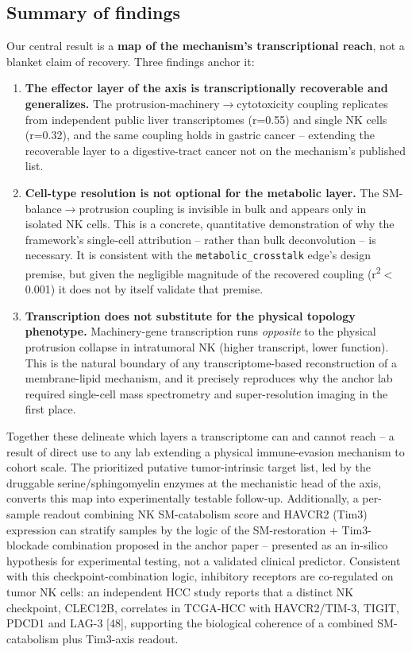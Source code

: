 \documentclass[modern,large,numbered,nocrop]{oup-authoring-template}
\begin{document}
\subsection{Summary of findings}

Our central result is a \textbf{map of the mechanism's transcriptional reach}, not a blanket claim of recovery. Three findings anchor it:

\begin{enumerate}
\item \textbf{The effector layer of the axis is transcriptionally recoverable and generalizes.} The protrusion-machinery$\to$cytotoxicity coupling replicates from independent public liver transcriptomes (r=0.55) and single NK cells (r=0.32), and the same coupling holds in gastric cancer -- extending the recoverable layer to a digestive-tract cancer not on the mechanism's published list.
\item \textbf{Cell-type resolution is not optional for the metabolic layer.} The SM-balance$\to$protrusion coupling is invisible in bulk and appears only in isolated NK cells. This is a concrete, quantitative demonstration of why the framework's single-cell attribution -- rather than bulk deconvolution -- is necessary. It is consistent with the \texttt{metabolic\_crosstalk} edge's design premise, but given the negligible magnitude of the recovered coupling (r\textsuperscript{2}$<$0.001) it does not by itself validate that premise.
\item \textbf{Transcription does not substitute for the physical topology phenotype.} Machinery-gene transcription runs \textit{opposite} to the physical protrusion collapse in intratumoral NK (higher transcript, lower function). This is the natural boundary of any transcriptome-based reconstruction of a membrane-lipid mechanism, and it precisely reproduces why the anchor lab required single-cell mass spectrometry and super-resolution imaging in the first place.
\end{enumerate}

Together these delineate which layers a transcriptome can and cannot reach -- a result of direct use to any lab extending a physical immune-evasion mechanism to cohort scale. The prioritized putative tumor-intrinsic target list, led by the druggable serine/sphingomyelin enzymes at the mechanistic head of the axis, converts this map into experimentally testable follow-up. Additionally, a per-sample readout combining NK SM-catabolism score and HAVCR2 (Tim3) expression can stratify samples by the logic of the SM-restoration + Tim3-blockade combination proposed in the anchor paper -- presented as an in-silico hypothesis for experimental testing, not a validated clinical predictor. Consistent with this checkpoint-combination logic, inhibitory receptors are co-regulated on tumor NK cells: an independent HCC study reports that a distinct NK checkpoint, CLEC12B, correlates in TCGA-HCC with HAVCR2/TIM-3, TIGIT, PDCD1 and LAG-3 [48], supporting the biological coherence of a combined SM-catabolism plus Tim3-axis readout.
\end{document}
